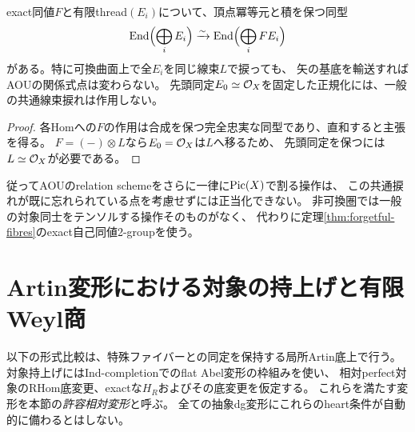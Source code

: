 \begin{proposition}[共通線束捩れはrelation表示に見えない]\label{prop:common-tensor}
exact同値$F$と有限thread$(E_i)$について、頂点冪等元と積を保つ同型
\[
 \operatorname{End}\Bigl(\bigoplus_iE_i\Bigr)
 \xrightarrow{\sim}\operatorname{End}\Bigl(\bigoplus_iFE_i\Bigr)
\]
がある。特に可換曲面上で全$E_i$を同じ線束$L$で捩っても、
矢の基底を輸送すればAOUの関係式点は変わらない。
先頭同定$E_0\simeq\mathcal O_X$を固定した正規化には、一般の共通線束捩れは作用しない。
\end{proposition}
\begin{proof}
各Homへの$F$の作用は合成を保つ完全忠実な同型であり、直和すると主張を得る。
$F=(-)\otimes L$なら$E_0=\mathcal O_X$は$L$へ移るため、
先頭同定を保つには$L\simeq\mathcal O_X$が必要である。
\end{proof}
従ってAOUのrelation schemeをさらに一律に$\operatorname{Pic}(X)$で割る操作は、
この共通捩れが既に忘れられている点を考慮せずには正当化できない。
非可換圏では一般の対象同士をテンソルする操作そのものがなく、
代わりに定理\ref{thm:forgetful-fibres}のexact自己同値2-groupを使う。

\section{Artin変形における対象の持上げと有限Weyl商}\label{sec:weyl}
以下の形式比較は、特殊ファイバーとの同定を保持する局所Artin底上で行う。
対象持上げにはInd-completionでのflat Abel変形の枠組みを使い、
相対perfect対象のRHom底変更、exactな$H_R$およびその底変更を仮定する。
これらを満たす変形を本節の\emph{許容相対変形}と呼ぶ。
全ての抽象dg変形にこれらのheart条件が自動的に備わるとはしない。

